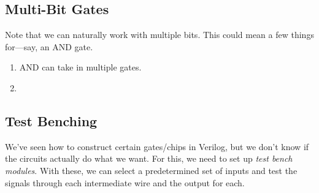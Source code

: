 \subsection{Multi-Bit Gates}

  Note that we can naturally work with multiple bits. This could mean a few things for---say, an AND gate. 
  \begin{enumerate}
    \item AND can take in multiple gates. 
    \item 
  \end{enumerate}

  \begin{definition}
    
  \end{definition}

  \begin{definition}
    
  \end{definition}

  \begin{definition}
    
  \end{definition}

  \begin{definition}
    
  \end{definition}

  \begin{definition}
    
  \end{definition}

  \begin{definition}
    
  \end{definition}

  \begin{definition}
    
  \end{definition}

\subsection{Test Benching}

  We've seen how to construct certain gates/chips in Verilog, but we don't know if the circuits actually do what we want. For this, we need to set up \textit{test bench modules}. With these, we can select a predetermined set of inputs and test the signals through each intermediate wire and the output for each. 


